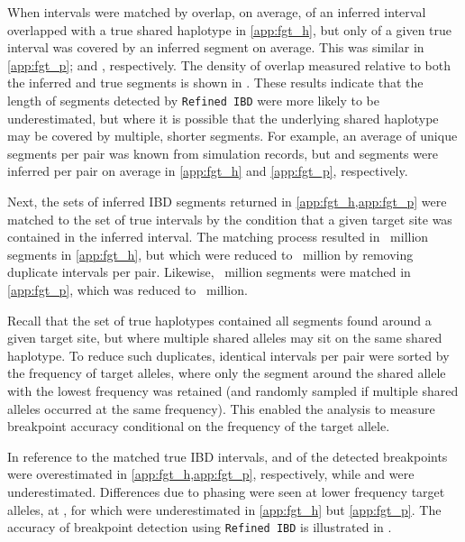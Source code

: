 %

%


When intervals were matched by overlap, on average,  of an inferred interval overlapped with a true shared haplotype in \cref{app:fgt_h}, but only  of a given true interval was covered by an inferred segment on average.
This was similar in \ref{app:fgt_p};  and , respectively.
The density of overlap measured relative to both the inferred and true segments is shown in .
These results indicate that the length of segments detected by \texttt{Refined\,IBD} were more likely to be underestimated, but where it is possible that the underlying shared haplotype may be covered by multiple, shorter segments.
For example, an average of  unique segments per pair was known from simulation records, but  and  segments were inferred per pair on average in \ref{app:fgt_h} and \ref{app:fgt_p}, respectively.



Next, the sets of inferred IBD segments returned in \cref{app:fgt_h,app:fgt_p} were matched to the set of true intervals by the condition that a given target site was contained in the inferred interval.
The matching process resulted in ~million segments in \ref{app:fgt_h}, but which were reduced to ~million by removing duplicate intervals per pair.
Likewise, ~million segments were matched in \ref{app:fgt_p}, which was reduced to ~million.

Recall that the set of true haplotypes contained all segments found around a given target site, but where multiple shared alleles may sit on the same shared haplotype.
To reduce such duplicates, identical intervals per pair were sorted by the frequency of target alleles, where only the segment around the shared allele with the lowest frequency was retained (and randomly sampled if multiple shared alleles occurred at the same frequency).
This enabled the analysis to measure breakpoint accuracy conditional on the frequency of the target allele.


%

%


In reference to the matched true IBD intervals,  and  of the detected breakpoints were overestimated in \cref{app:fgt_h,app:fgt_p}, respectively,
while  and  were underestimated.
Differences due to phasing were seen at lower frequency target alleles, \eg at , for which
 were underestimated in \ref{app:fgt_h} but  \ref{app:fgt_p}.
The accuracy of breakpoint detection using \texttt{Refined\,IBD} is illustrated in .


